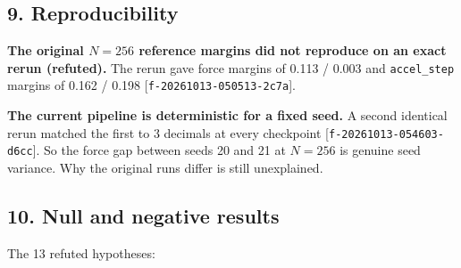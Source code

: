 \documentclass{article}
\begin{document}
\subsection{9. Reproducibility}

\textbf{The original $N = 256$ reference margins did not reproduce on an exact rerun (refuted).} The rerun gave force margins of 0.113 / 0.003 and \texttt{accel\_step} margins of 0.162 / 0.198 [\texttt{f-20261013-050513-2c7a}].

\textbf{The current pipeline is deterministic for a fixed seed.} A second identical rerun matched the first to 3 decimals at every checkpoint [\texttt{f-20261013-054603-d6cc}]. So the force gap between seeds 20 and 21 at $N = 256$ is genuine seed variance. Why the original runs differ is still unexplained.

\subsection{10. Null and negative results}

The 13 refuted hypotheses:
\end{document}
